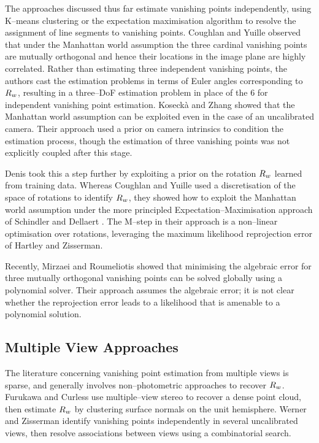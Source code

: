 The approaches discussed thus far estimate vanishing points
independently, using K--means clustering or the expectation
maximisation algorithm to resolve the assignment of line segments to
vanishing points. Coughlan and Yuille \cite{Coughlan99} observed that
under the Manhattan world assumption the three cardinal vanishing
points are mutually orthogonal and hence their locations in the image
plane are highly correlated. Rather than estimating three independent
vanishing points, the authors cast the estimation problems in terms of
Euler angles corresponding to $\SceneR$, resulting in a three--DoF
estimation problem in place of the 6 for independent vanishing point
estimation. Koseck\`{a} and Zhang \cite{Zhang02} showed that the
Manhattan world assumption can be exploited even in the case of an
uncalibrated camera. Their approach used a prior on camera intrinsics
to condition the estimation process, though the estimation of three
vanishing points was not explicitly coupled after this stage.

Denis \etal \cite{denis2008efficient} took this a step further by
exploiting a prior on the rotation $\SceneR$ learned from training
data. Whereas Coughlan and Yuille used a discretisation of the space
of rotations to identify $\SceneR$, they showed how to exploit the
Manhattan world assumption under the more principled
Expectation--Maximisation approach of Schindler and Dellaert
\cite{Schindler2004}. The M--step in their approach is a non--linear
optimisation over rotations, leveraging the maximum likelihood
reprojection error of Hartley and Zisserman\cite{Hartley04}.

Recently, Mirzaei and Roumeliotis \cite{Mirzaei2011} showed that
minimising the algebraic error for three mutually orthogonal vanishing
points can be solved globally using a polynomial solver. Their
approach assumes the algebraic error; it is not clear whether the
reprojection error leads to a likelihood that is amenable to a
polynomial solution.

\subsection{Multiple View Approaches}

The literature concerning vanishing point estimation from multiple
views is sparse, and generally involves non--photometric approaches to
recover $\SceneR$. Furukawa and Curless \cite{Furukawa09} use
multiple--view stereo to recover a dense point cloud, then estimate
$\SceneR$ by clustering surface normals on the unit hemisphere. Werner
and Zisserman \cite{Werner2002} identify vanishing points
independently in several uncalibrated views, then resolve associations
between views using a combinatorial search.

